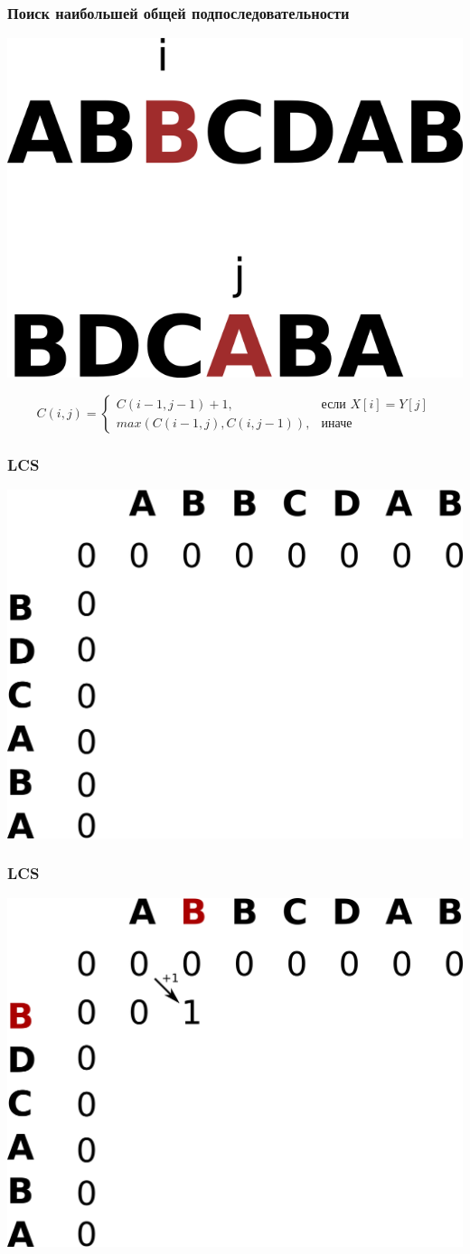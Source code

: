 \documentclass[12pt,pdf,hyperref={unicode}]{beamer}
\begin{document}
\begin{frame}[fragile]
\frametitle{Поиск наибольшей общей подпоследовательности} 
\begin{center}
\includegraphics[width=0.40\linewidth]{images/lcs3.png}
\end{center}
\[
C(i, j) = 
\begin{cases}
    C(i-1, j-1) + 1,             & \text{если } X[i] = Y[j]\\
    max(C(i-1, j), C(i, j-1)),   & \text{иначе}
\end{cases}
\]
\end{frame}

\begin{frame}[fragile]
\frametitle{LCS} 
\begin{center}
\includegraphics[width=0.75\linewidth]{images/lcstable1.png}
\end{center}
\end{frame}

\begin{frame}[fragile]
\frametitle{LCS} 
\begin{center}
\includegraphics[width=0.75\linewidth]{images/lcstable2.png}
\end{center}
\end{frame}
\end{document}
